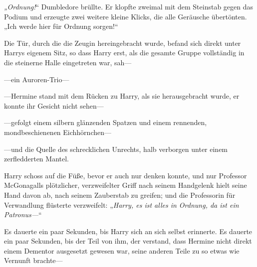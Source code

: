 \emph{„Ordnung!}“ Dumbledore brüllte. Er klopfte zweimal mit dem Steinstab gegen das Podium und erzeugte zwei weitere kleine Klicks, die alle Geräusche übertönten. „Ich werde hier für Ordnung sorgen!“

Die Tür, durch die die Zeugin hereingebracht wurde, befand sich direkt unter Harrys eigenem Sitz, so dass Harry erst, als die gesamte Gruppe vollständig in die steinerne Halle eingetreten war, sah—




—ein Auroren-Trio—

—Hermine stand mit dem Rücken zu Harry, als sie herausgebracht wurde, er konnte ihr Gesicht nicht sehen—

—gefolgt einem silbern glänzenden Spatzen und einem rennenden, mondbeschienenen Eichhörnchen—

—und die Quelle des schrecklichen Unrechts, halb verborgen unter einem zerfledderten Mantel.

Harry schoss auf die Füße, bevor er auch nur denken konnte, und nur Professor McGonagalls plötzlicher, verzweifelter Griff nach seinem Handgelenk hielt seine Hand davon ab, nach seinem Zauberstab zu greifen; und die Professorin für Verwandlung flüsterte verzweifelt:
„\emph{Harry, es ist alles in Ordnung, da ist ein Patronus—}“

Es dauerte ein paar Sekunden, bis Harry sich an sich selbst erinnerte. Es dauerte ein paar Sekunden, bis der Teil von ihm, der verstand, dass Hermine nicht direkt einem Dementor ausgesetzt gewesen war, seine anderen Teile zu so etwas wie Vernunft brachte—

